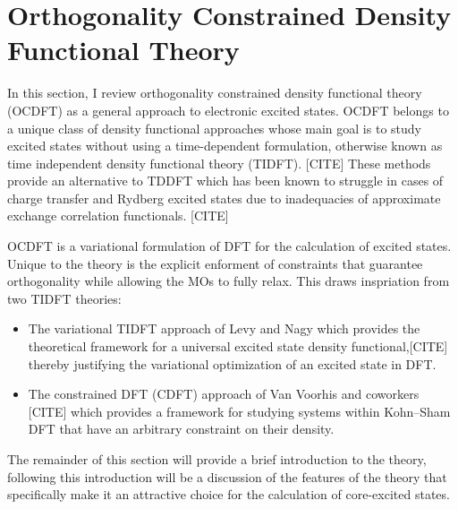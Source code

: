 \documentclass[final]{emory}
\begin{document}
\section{Orthogonality Constrained Density Functional Theory}
In this section, I review orthogonality constrained density functional theory (OCDFT) as a general approach to electronic excited states. OCDFT belongs to a unique class of density functional approaches whose main goal is to study excited states without using a time-dependent formulation, otherwise known as time independent density functional theory (TIDFT). [CITE] These methods provide an alternative to TDDFT which has been known to struggle in cases of charge transfer and Rydberg excited states due to inadequacies of approximate exchange correlation functionals. [CITE] 

OCDFT is a variational formulation of DFT for the calculation of excited states. Unique to the theory is the explicit enforment of constraints that guarantee orthogonality while allowing the MOs to fully relax. This draws inspriation from two TIDFT theories: 
\begin{itemize}
\item The variational TIDFT approach of Levy and Nagy which provides the theoretical framework for a universal excited state density functional,[CITE] thereby justifying the variational optimization of an excited state in DFT.
\item The constrained DFT (CDFT) approach of Van Voorhis and coworkers [CITE] which provides a framework for studying systems within Kohn--Sham DFT that have an arbitrary constraint on their density.
\end{itemize} 
The remainder of this section will provide a brief introduction to the theory, following this introduction will be a discussion of the features of the theory that specifically make it an attractive choice for the calculation of core-excited states.
\end{document}
